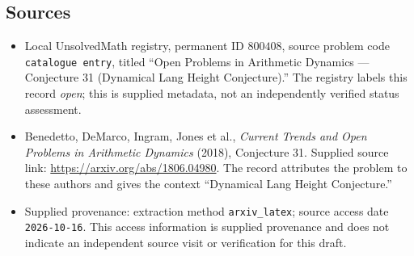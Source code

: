 \documentclass[11pt]{article}
\begin{document}
\subsection{Sources}
\begin{itemize}
\item Local UnsolvedMath registry, permanent ID \(800408\), source problem code \texttt{catalogue entry}, titled ``Open Problems in Arithmetic Dynamics --- Conjecture 31 (Dynamical Lang Height Conjecture).'' The registry labels this record \emph{open}; this is supplied metadata, not an independently verified status assessment.
\item Benedetto, DeMarco, Ingram, Jones et al., \emph{Current Trends and Open Problems in Arithmetic Dynamics} (2018), Conjecture 31. Supplied source link: \url{https://arxiv.org/abs/1806.04980}. The record attributes the problem to these authors and gives the context ``Dynamical Lang Height Conjecture.''
\item Supplied provenance: extraction method \texttt{arxiv\_latex}; source access date \texttt{2026-10-16}. This access information is supplied provenance and does not indicate an independent source visit or verification for this draft.
\end{itemize}
\end{document}
